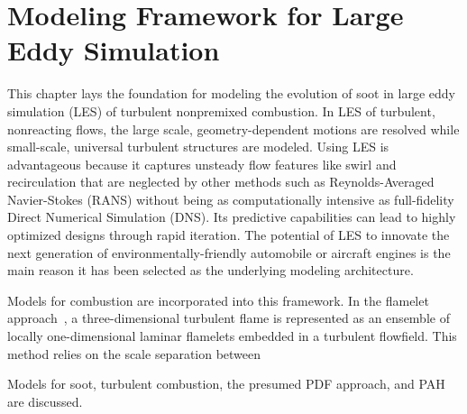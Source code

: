\chapter{Modeling Framework for Large Eddy Simulation\label{ch:lesmodels}}

This chapter lays the foundation for modeling the evolution of soot in large eddy simulation (LES) of turbulent nonpremixed combustion. In LES of turbulent, nonreacting flows, the large scale, geometry-dependent motions are resolved while small-scale, universal turbulent structures are modeled. Using LES is advantageous because it captures unsteady flow features like swirl and recirculation that are neglected by other methods such as Reynolds-Averaged Navier-Stokes (RANS) without being as computationally intensive as full-fidelity Direct Numerical Simulation (DNS). Its predictive capabilities can lead to highly optimized designs through rapid iteration. The potential of LES to innovate the next generation of environmentally-friendly automobile or aircraft engines is the main reason it has been selected as the underlying modeling architecture.

Models for combustion are incorporated into this framework. In the flamelet approach~\cite{peters1984}, a three-dimensional turbulent flame is represented as an ensemble of locally one-dimensional laminar flamelets embedded in a turbulent flowfield. This method relies on the scale separation between 

Models for soot, turbulent combustion, the presumed PDF approach, and PAH are discussed.





